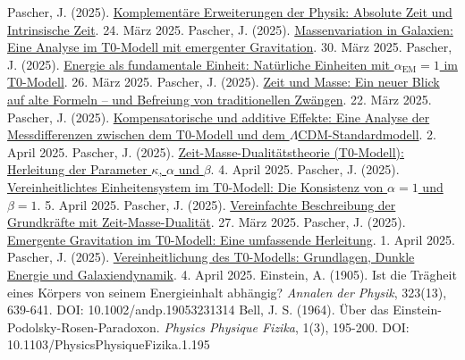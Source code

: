 \documentclass[12pt,a4paper]{article}
\newcommand{\alphaEM}{\alpha_{\text{EM}}}
\begin{document}
	\begin{thebibliography}{99}
		 Pascher, J. (2025). \href{https://github.com/jpascher/T0-Time-Mass-Duality/tree/main/2/pdf/Deutsch/KomplementPhysikZeit.pdf}{Komplementäre Erweiterungen der Physik: Absolute Zeit und Intrinsische Zeit}. 24. März 2025.
		 Pascher, J. (2025). \href{https://github.com/jpascher/T0-Time-Mass-Duality/tree/main/2/pdf/Deutsch/MassVarGalaxien.pdf}{Massenvariation in Galaxien: Eine Analyse im T0-Modell mit emergenter Gravitation}. 30. März 2025.
		 Pascher, J. (2025). \href{https://github.com/jpascher/T0-Time-Mass-Duality/tree/main/2/pdf/Deutsch/NatEinheitenAlpha1.pdf}{Energie als fundamentale Einheit: Natürliche Einheiten mit \(\alphaEM = 1\) im T0-Modell}. 26. März 2025.
		 Pascher, J. (2025). \href{https://github.com/jpascher/T0-Time-Mass-Duality/tree/main/2/pdf/Deutsch/ZeitMasseNeuerBlick.pdf}{Zeit und Masse: Ein neuer Blick auf alte Formeln – und Befreiung von traditionellen Zwängen}. 22. März 2025.
		 Pascher, J. (2025). \href{https://github.com/jpascher/T0-Time-Mass-Duality/tree/main/2/pdf/Deutsch/MessdifferenzenT0Standard.pdf}{Kompensatorische und additive Effekte: Eine Analyse der Messdifferenzen zwischen dem T0-Modell und dem \(\Lambda\)CDM-Standardmodell}. 2. April 2025.
		 Pascher, J. (2025). \href{https://github.com/jpascher/T0-Time-Mass-Duality/tree/main/2/pdf/Deutsch/ZeitMasseT0Params.pdf}{Zeit-Masse-Dualitätstheorie (T0-Modell): Herleitung der Parameter \(\kappa\), \(\alpha\) und \(\beta\)}. 4. April 2025.
		 Pascher, J. (2025). \href{https://github.com/jpascher/T0-Time-Mass-Duality/tree/main/2/pdf/Deutsch/Alpha1Beta1Konsistenz.pdf}{Vereinheitlichtes Einheitensystem im T0-Modell: Die Konsistenz von \(\alpha = 1\) und \(\beta = 1\)}. 5. April 2025.
		 Pascher, J. (2025). \href{https://github.com/jpascher/T0-Time-Mass-Duality/tree/main/2/pdf/Deutsch/VierKraefteZeitMasse.pdf}{Vereinfachte Beschreibung der Grundkräfte mit Zeit-Masse-Dualität}. 27. März 2025.
		 Pascher, J. (2025). \href{https://github.com/jpascher/T0-Time-Mass-Duality/tree/main/2/pdf/Deutsch/EmergentGravT0.pdf}{Emergente Gravitation im T0-Modell: Eine umfassende Herleitung}. 1. April 2025.
		 Pascher, J. (2025). \href{https://github.com/jpascher/T0-Time-Mass-Duality/tree/main/2/pdf/Deutsch/T0VereinheitlichungDEGal.pdf}{Vereinheitlichung des T0-Modells: Grundlagen, Dunkle Energie und Galaxiendynamik}. 4. April 2025.
		 Einstein, A. (1905). Ist die Trägheit eines Körpers von seinem Energieinhalt abhängig? \textit{Annalen der Physik}, 323(13), 639-641. DOI: 10.1002/andp.19053231314
		 Bell, J. S. (1964). Über das Einstein-Podolsky-Rosen-Paradoxon. \textit{Physics Physique Fizika}, 1(3), 195-200. DOI: 10.1103/PhysicsPhysiqueFizika.1.195
		

\end{thebibliography}
\end{document}

